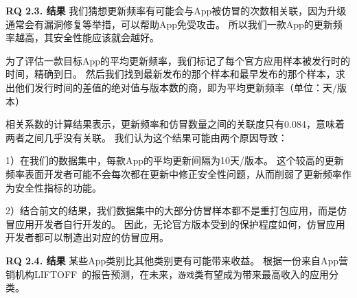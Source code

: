 {\bf RQ 2.3. 结果}
我们猜想更新频率有可能会与App被仿冒的次数相关联，因为升级通常会有漏洞修复等举措，可以帮助App免受攻击。
所以我们一款App的更新频率越高，其安全性能应该就会越好。

为了评估一款目标App的平均更新频率，我们标记了每个官方应用样本被发行时的时间，精确到日。
然后我们找到最新发布的那个样本和最早发布的那个样本，求出他们发行时间的差值的绝对值与版本数的商，即为平均更新频率（单位：天/版本）

相关系数的计算结果表示，更新频率和仿冒数量之间的关联度只有0.084，意味着两者之间几乎没有关联。
我们认为这个结果可能由两个原因导致：

1）在我们的数据集中，每款App的平均更新间隔为10天/版本。
这个较高的更新频率表面开发者可能不会每次都在更新中修正安全性问题，从而削弱了更新频率作为安全性指标的功能。

2）结合前文的结果，我们数据集中的大部分仿冒样本都不是重打包应用，而是仿冒应用开发者自行开发的。
因此，无论官方版本受到的保护程度如何，仿冒应用开发者都可以制造出对应的仿冒应用。

{\bf RQ 2.4. 结果}
某些App类别比其他类别更有可能带来收益。
根据一份来自App营销机构LIFTOFF~\cite{LIFTOFF_report}的报告预测，在未来，\texttt{游戏}类有望成为带来最高收入的应用分类。

